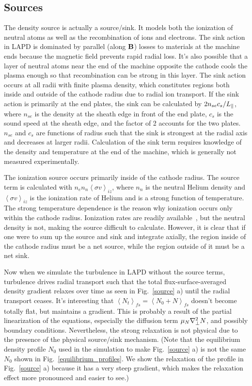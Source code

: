 \subsection{Sources}
\label{ss_sources}

The density source is actually a source/sink. It models both the ionization of neutral atoms as well as the recombination of ions and electrons. The sink action in LAPD
is dominated by parallel (along ${\bf B}$) losses to materials at the machine ends because the magnetic field prevents rapid radial loss. 
It's also possible that a layer of neutral atoms near the end of
the machine opposite the cathode cools the plasma enough so that recombination can be strong in this layer. The sink action occurs at all radii with finite plasma density, which constitutes regions
both inside and outside of the cathode radius due to radial ion transport. If the sink action is primarily at the end plates, the sink can be calculated by $2 n_{se} c_s/L_{\parallel}$, where
$n_{se}$ is the density at the sheath edge in front of the end plate, $c_s$ is the sound speed at the sheath edge, and the factor of 2 accounts for the two plates. $n_{se}$ and $c_s$ are functions
of radius such that the sink is strongest at the radial axis and decreases at larger radii. Calculation of the sink term requires knowledge of the density and temperature at the end of the machine,
which is generally not measured experimentally.

The ionization source occurs primarily inside of the cathode radius. The source term is calculated with $n_e n_n \left<\sigma v \right>_{iz}$, 
where $n_n$ is the neutral Helium density and $\left< \sigma v \right>_{iz}$
is the ionization rate of Helium and is a strong function of temperature. The strong temperature dependence is the reason why ionization occurs only within the cathode radius.
Ionization rates are readily available~\cite{stangeby2000}, but the neutral density is not, making the source difficult to calculate. However, it is clear that if one were to sum up
the source and sink and integrate axially, the region inside of the cathode radius must be a net source, while the region outside of it must be a net sink.

Now when we simulate the turbulence in LAPD without the source terms, turbulence drives radial transport such that the total flux-surface-averaged density gradient relaxes over time as seen
in Fig.~\ref{source} a) until the radial transport ceases. It's interesting that $\left< N_t \right>_{fs} = \left< N_0 + N \right>_{fs}$ doesn't become totally flat, but maintains a gradient. 
This is probably a result
of the partial linearization of the equations, especially the diffusion term $\mu_N \nabla_\perp^2 N$, and possibly boundary conditions. Nevertheless, the strong relaxation is not physical due
to the presence of the physical source/sink mechanism. (Note that the equilibrium density profile $N_0$ used in the simulation to make Fig.~\ref{source} a)
is not the same $N_0$ shown in Fig.~\ref{equilibrium_profiles}. We show the relaxation of the profile in Fig.~\ref{source} a) because it has a very steep gradient, which makes
the relaxation effect more pronounced and easier to see.)

